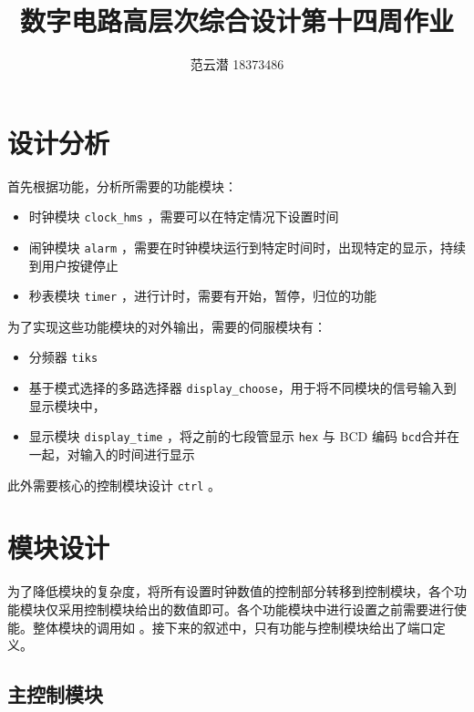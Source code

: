 \documentclass[lang=cn,11pt,a4paper,cite=authoryear]{elegantpaper}
\title{数字电路高层次综合设计\quad 第十四周作业}
\author{范云潜 18373486}
\institute{微电子学院 184111 班}
\date{\zhtoday}
\begin{document}
\maketitle


\tableofcontents

\section{设计分析}

首先根据功能，分析所需要的功能模块：

\begin{itemize}
    \item 时钟模块 \lstinline{clock_hms} ，需要可以在特定情况下设置时间
    \item 闹钟模块 \lstinline{alarm} ，需要在时钟模块运行到特定时间时，出现特定的显示，持续到用户按键停止
    \item 秒表模块 \lstinline{timer} ，进行计时，需要有开始，暂停，归位的功能
\end{itemize}

为了实现这些功能模块的对外输出，需要的伺服模块有：

\begin{itemize}
    \item 分频器 \lstinline{tiks} 
    \item 基于模式选择的多路选择器 \lstinline{display_choose}，用于将不同模块的信号输入到显示模块中，
    \item 显示模块 \lstinline{display_time} ，将之前的七段管显示 \lstinline{hex} 与 BCD 编码 \lstinline{bcd}合并在一起，对输入的时间进行显示
\end{itemize} 

此外需要核心的控制模块设计 \lstinline{ctrl} 。

\section{模块设计}

为了降低模块的复杂度，将所有设置时钟数值的控制部分转移到控制模块，各个功能模块仅采用控制模块给出的数值即可。各个功能模块中进行设置之前需要进行使能。整体模块的调用如  。接下来的叙述中，只有功能与控制模块给出了端口定义。


\subsection{主控制模块}
\end{document}
